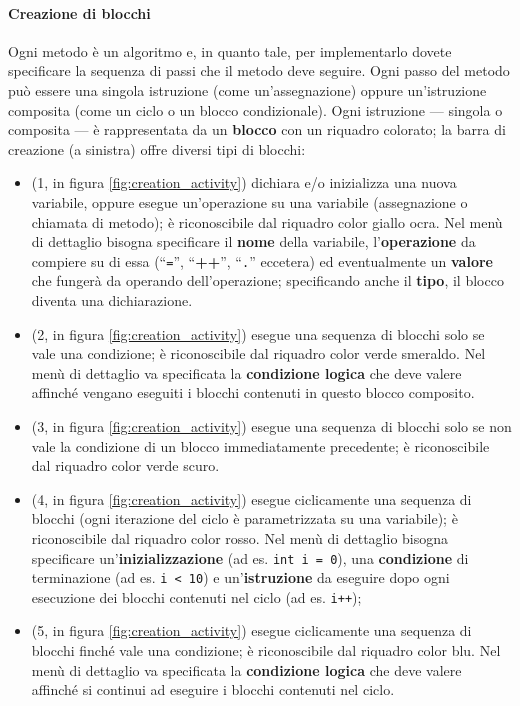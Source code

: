 \paragraph{Creazione di blocchi} Ogni metodo è un algoritmo e, in quanto tale, per implementarlo dovete specificare la sequenza di passi che il metodo deve seguire. Ogni passo del metodo può essere una singola istruzione (come un'assegnazione) oppure un'istruzione composita (come un ciclo o un blocco condizionale). Ogni istruzione --- singola o composita --- è rappresentata da un \textbf{blocco} con un riquadro colorato; la barra di creazione (a sinistra) offre diversi tipi di blocchi:
\begin{itemize}
	\item {} (1, in figura \ref{fig:creation_activity}) dichiara e/o inizializza una nuova variabile, oppure esegue un'operazione su una variabile (assegnazione o chiamata di metodo); è riconoscibile dal riquadro color giallo ocra. Nel menù di dettaglio bisogna specificare il \textbf{nome} della variabile, l'\textbf{operazione} da compiere su di essa (“\texttt{=}”, “\textbf{++}”, “\texttt{.}” eccetera) ed eventualmente un \textbf{valore} che fungerà da operando dell'operazione; specificando anche il \textbf{tipo}, il blocco diventa una dichiarazione.
	\item {} (2, in figura \ref{fig:creation_activity}) esegue una sequenza di blocchi solo se vale una condizione; è riconoscibile dal riquadro color verde smeraldo. Nel menù di dettaglio va specificata la \textbf{condizione logica} che deve valere affinché vengano eseguiti i blocchi contenuti in questo blocco composito.
	\item {} (3, in figura \ref{fig:creation_activity}) esegue una sequenza di blocchi solo se non vale la condizione di un blocco  immediatamente precedente; è riconoscibile dal riquadro color verde scuro.
	\item {} (4, in figura \ref{fig:creation_activity}) esegue ciclicamente una sequenza di blocchi (ogni iterazione del ciclo è parametrizzata su una variabile); è riconoscibile dal riquadro color rosso. Nel menù di dettaglio bisogna specificare un'\textbf{inizializzazione} (ad es. \texttt{int i = 0}), una \textbf{condizione} di terminazione (ad es. \texttt{i < 10}) e un'\textbf{istruzione} da eseguire dopo ogni esecuzione dei blocchi contenuti nel ciclo (ad es. \texttt{i++});
	\item {} (5, in figura \ref{fig:creation_activity}) esegue ciclicamente una sequenza di blocchi finché vale una condizione; è riconoscibile dal riquadro color blu. Nel menù di dettaglio va specificata la \textbf{condizione logica} che deve valere affinché si continui ad eseguire i blocchi contenuti nel ciclo.

\end{itemize}
